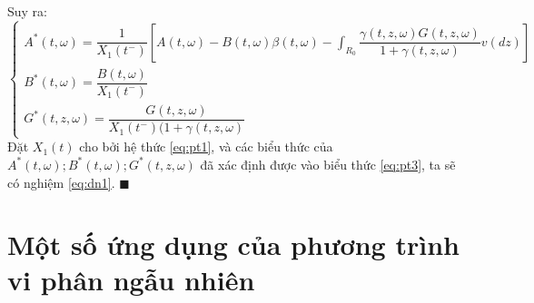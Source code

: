 \documentclass[a4paper]{article}
\numberwithin{equation}{section}
\begin{document}
Suy ra:
\begin{dmath*}
\begin{cases}
	A^*(t,\omega)=\dfrac{1}{X_1(t^-)} \left[A(t,\omega)-B(t,\omega)\beta(t,\omega)-\int_{R_0} \dfrac{\gamma(t,z,\omega)G(t,z,\omega)}{1+\gamma(t,z,\omega)} v(dz) \right] \\
	B^*(t,\omega)=\dfrac{B(t,\omega)}{X_1(t^-)} \\
	G^*(t,z,\omega)=\dfrac{G(t,z,\omega)}{X_1(t^-)(1+\gamma(t,z,\omega)}
\end{cases}	
\end{dmath*}
Đặt $X_1(t)$ cho bởi hệ thức \eqref{eq:pt1}, và các biểu thức của $A^*(t,\omega);B^*(t,\omega);G^*(t,z,\omega)$ đã xác định được vào biểu thức \eqref{eq:pt3}, ta sẽ có nghiệm \eqref{eq:dn1}. $\blacksquare$\\
\section{Một số ứng dụng của phương trình vi phân ngẫu nhiên}\setlength{\emergencystretch}{3em}
\end{document}
